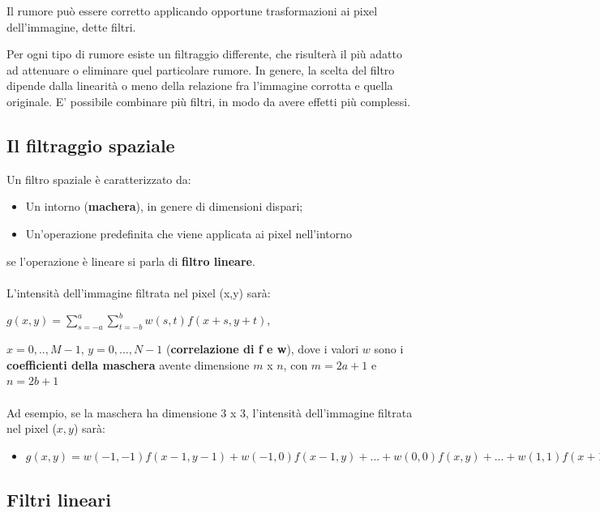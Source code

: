 \begin{definition}
    Il rumore può essere corretto applicando opportune trasformazioni ai pixel dell'immagine, dette filtri.
\end{definition}
Per ogni tipo di rumore esiste un filtraggio differente, che risulterà il più adatto ad attenuare o eliminare quel particolare rumore.
In genere, la scelta del filtro dipende dalla linearità o meno della relazione fra l'immagine corrotta e quella originale.
E' possibile combinare più filtri, in modo da avere effetti più complessi.

\subsection{Il filtraggio spaziale}

Un filtro spaziale è caratterizzato da:

\begin{itemize}
    \item Un intorno (\textbf{machera}), in genere di dimensioni dispari;
    \item Un'operazione predefinita che viene applicata ai pixel nell'intorno
\end{itemize}
se l'operazione è lineare si parla di \textbf{filtro lineare}.
\\\\
L'intensità dell'immagine filtrata nel pixel (x,y) sarà:

\begin{center}
    $g(x,y) = \sum_{s=-a}^{a}\sum_{t=-b}^{b}w(s,t)f(x+s,y+t)$,
\end{center}

$x=0,..,M-1$, $y=0,...,N-1$ (\textbf{correlazione di f e w}), dove i valori $w$ sono i \textbf{coefficienti della maschera}
avente dimensione $m$ x $n$, con $m = 2a+1$ e $n = 2b+1$
\\\\
Ad esempio, se la maschera ha dimensione 3 x 3, l'intensità dell'immagine filtrata nel pixel ($x,y$) sarà:
\begin{itemize}
    \item $g(x,y)=w(-1,-1)f(x-1,y-1)+w(-1,0)f(x-1,y)+...+w(0,0)f(x,y)+...+w(1,1)f(x+1,y+1)$
\end{itemize}

\subsection{Filtri lineari}

